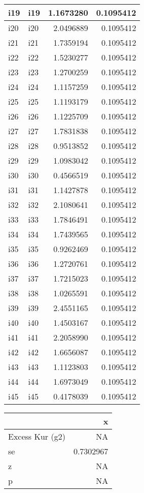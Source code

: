 \documentclass[
]{article}
\begin{document}
\begin{table}
\begin{tabular}[t]{l|l|r|r}
\hline
i19 & i19 & 1.1673280 & 0.1095412\\
\hline
i20 & i20 & 2.0496889 & 0.1095412\\
\hline
i21 & i21 & 1.7359194 & 0.1095412\\
\hline
i22 & i22 & 1.5230277 & 0.1095412\\
\hline
i23 & i23 & 1.2700259 & 0.1095412\\
\hline
i24 & i24 & 1.1157259 & 0.1095412\\
\hline
i25 & i25 & 1.1193179 & 0.1095412\\
\hline
i26 & i26 & 1.1225709 & 0.1095412\\
\hline
i27 & i27 & 1.7831838 & 0.1095412\\
\hline
i28 & i28 & 0.9513852 & 0.1095412\\
\hline
i29 & i29 & 1.0983042 & 0.1095412\\
\hline
i30 & i30 & 0.4566519 & 0.1095412\\
\hline
i31 & i31 & 1.1427878 & 0.1095412\\
\hline
i32 & i32 & 2.1080641 & 0.1095412\\
\hline
i33 & i33 & 1.7846491 & 0.1095412\\
\hline
i34 & i34 & 1.7439565 & 0.1095412\\
\hline
i35 & i35 & 0.9262469 & 0.1095412\\
\hline
i36 & i36 & 1.2720761 & 0.1095412\\
\hline
i37 & i37 & 1.7215023 & 0.1095412\\
\hline
i38 & i38 & 1.0265591 & 0.1095412\\
\hline
i39 & i39 & 2.4551165 & 0.1095412\\
\hline
i40 & i40 & 1.4503167 & 0.1095412\\
\hline
i41 & i41 & 2.2058990 & 0.1095412\\
\hline
i42 & i42 & 1.6656087 & 0.1095412\\
\hline
i43 & i43 & 1.1123803 & 0.1095412\\
\hline
i44 & i44 & 1.6973049 & 0.1095412\\
\hline
i45 & i45 & 0.4178039 & 0.1095412\\
\hline
\end{tabular}
\centering
\begin{tabular}[t]{l|r}
\hline
  & x\\
\hline
Excess Kur (g2) & NA\\
\hline
se & 0.7302967\\
\hline
z & NA\\
\hline
p & NA\\
\hline
\end{tabular}
\end{table}
\end{document}
